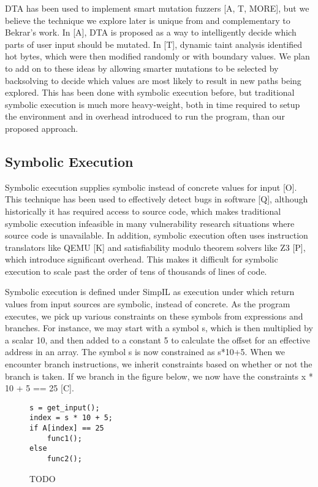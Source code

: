 \documentclass[11pt,expanded,copyright]{fsuthesis}
\begin{document}
DTA has been used to implement smart mutation fuzzers [A, T, MORE], but we believe the technique we explore later is unique from and complementary to Bekrar's work. In [A], DTA is proposed as a way to intelligently decide which parts of user input should be mutated. In [T], dynamic taint analysis identified hot bytes, which were then modified randomly or with boundary values. We plan to add on to these ideas by allowing smarter mutations to be selected by backsolving to decide which values are most likely to result in new paths being explored. This has been done with symbolic execution before, but traditional symbolic execution is much more heavy-weight, both in time required to setup the environment and in overhead introduced to run the program, than our proposed approach.

\subsection{Symbolic Execution}


Symbolic execution supplies symbolic instead of concrete values for input [O]. This technique has been used to effectively detect bugs in software [Q], although historically it has required access to source code, which makes traditional symbolic execution infeasible in many vulnerability research situations where source code is unavailable. In addition, symbolic execution often uses instruction translators like QEMU [K] and satisfiability modulo theorem solvers like Z3 [P], which introduce significant overhead. This makes it difficult for symbolic execution to scale past the order of tens of thousands of lines of code. 

Symbolic execution is defined under SimpIL as execution under which return values from input sources are symbolic, instead of concrete. As the program executes, we pick up various constraints on these symbols from expressions and branches. For instance, we may start with a symbol s, which is then multiplied by a scalar 10, and then added to a constant 5 to calculate the offset for an effective address in an array. The symbol s is now constrained as s*10+5. When we encounter branch instructions, we inherit constraints based on whether or not the branch is taken. If we branch in the figure below, we now have the constraints x * 10 + 5 == 25 [C].

\begin{figure}
\begin{lstlisting}[style=cstyle]
s = get_input();
index = s * 10 + 5;
if A[index] == 25
	func1();
else
	func2();
\end{lstlisting}
\caption{TODO}
\end{figure}
\end{document}
